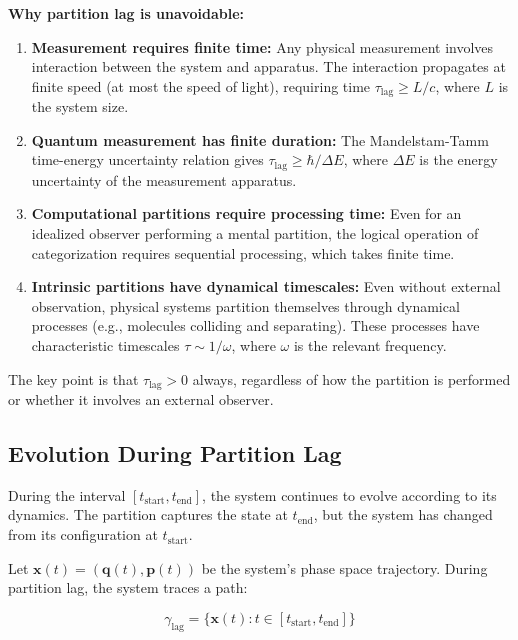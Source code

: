 \documentclass[twocolumn,10pt]{article}
\theoremstyle{definition}
\theoremstyle{remark}
\begin{document}
\textbf{Why partition lag is unavoidable:}

\begin{enumerate}
\item \textbf{Measurement requires finite time:} Any physical measurement involves interaction between the system and apparatus. The interaction propagates at finite speed (at most the speed of light), requiring time $\tau_{\text{lag}} \geq L/c$, where $L$ is the system size.

\item \textbf{Quantum measurement has finite duration:} The Mandelstam-Tamm time-energy uncertainty relation \cite{mandelstam1945} gives $\tau_{\text{lag}} \geq \hbar / \Delta E$, where $\Delta E$ is the energy uncertainty of the measurement apparatus.

\item \textbf{Computational partitions require processing time:} Even for an idealized observer performing a mental partition, the logical operation of categorization requires sequential processing, which takes finite time.

\item \textbf{Intrinsic partitions have dynamical timescales:} Even without external observation, physical systems partition themselves through dynamical processes (e.g., molecules colliding and separating). These processes have characteristic timescales $\tau \sim 1/\omega$, where $\omega$ is the relevant frequency.
\end{enumerate}

The key point is that $\tau_{\text{lag}} > 0$ always, regardless of how the partition is performed or whether it involves an external observer.

\subsection{Evolution During Partition Lag}

During the interval $[t_{\text{start}}, t_{\text{end}}]$, the system continues to evolve according to its dynamics. The partition captures the state at $t_{\text{end}}$, but the system has changed from its configuration at $t_{\text{start}}$.

Let $\mathbf{x}(t) = (\mathbf{q}(t), \mathbf{p}(t))$ be the system's phase space trajectory. During partition lag, the system traces a path:

$$
\gamma_{\text{lag}} = \{\mathbf{x}(t) : t \in [t_{\text{start}}, t_{\text{end}}]\}
$$
\end{document}
